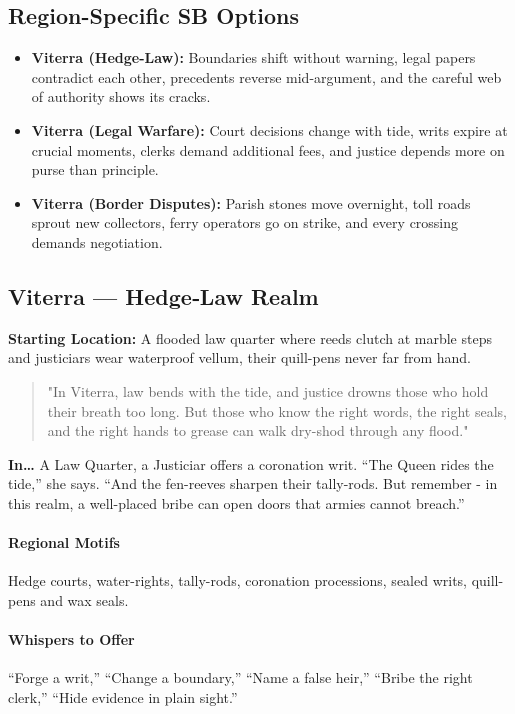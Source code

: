 \subsection*{Region-Specific SB Options}
\begin{itemize}
\item \textbf{Viterra (Hedge-Law):} Boundaries shift without warning, legal papers contradict each other, precedents reverse mid-argument, and the careful web of authority shows its cracks.
\item \textbf{Viterra (Legal Warfare):} Court decisions change with tide, writs expire at crucial moments, clerks demand additional fees, and justice depends more on purse than principle.
\item \textbf{Viterra (Border Disputes):} Parish stones move overnight, toll roads sprout new collectors, ferry operators go on strike, and every crossing demands negotiation.
\end{itemize}

\subsection*{Viterra — Hedge‑Law Realm}
\textbf{Starting Location:} A flooded law quarter where reeds clutch at marble steps and justiciars wear waterproof vellum, their quill-pens never far from hand.
\begin{quote}
"In Viterra, law bends with the tide, and justice drowns those who hold their breath too long. But those who know the right words, the right seals, and the right hands to grease can walk dry-shod through any flood."
\end{quote}

\textbf{In…} A Law Quarter, a Justiciar offers a coronation writ. ``The Queen rides the tide,'' she says. ``And the fen-reeves sharpen their tally-rods. But remember - in this realm, a well-placed bribe can open doors that armies cannot breach.''

\paragraph{Regional Motifs} Hedge courts, water-rights, tally-rods, coronation processions, sealed writs, quill-pens and wax seals.
\paragraph{Whispers to Offer} ``Forge a writ,'' ``Change a boundary,'' ``Name a false heir,'' ``Bribe the right clerk,'' ``Hide evidence in plain sight.''
